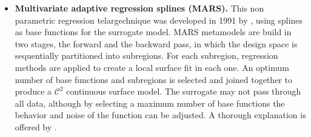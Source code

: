 \documentclass[12pt,number,preprint,review,times]{elsarticle}
\begin{document}
\begin{itemize}



\item \textbf{Multivariate adaptive regression splines (MARS).} This non parametric regression telargechnique was developed in 1991 by \citet{Friedman}, using splines as base functions for the surrogate model. MARS metamodels are build in two stages, the forward and the backward pass, in which the design space is sequentially partitioned into subregions. For each subregion, regression methods are applied to create a local surface fit in each one. An optimum number of base functions and subregions is selected and joined together to produce a $\mathcal{C}^{2}$ continuous surface model. The surrogate may not pass through all data, although by selecting a maximum number of base functions the behavior and noise of the function can be adjusted. A thorough explanation is offered by \citet{Friedman1995197}.


\end{itemize}
\end{document}
